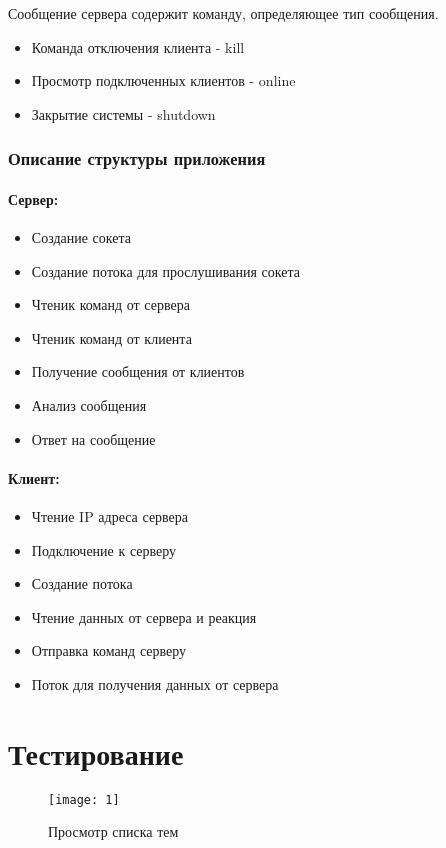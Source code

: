Сообщение сервера содержит команду, определяющее тип сообщения.
\begin{itemize}
\item Команда отключения клиента - kill
\item Просмотр подключенных клиентов  - online
\item Закрытие системы - shutdown
\end{itemize}


\subsubsection{Описание структуры приложения}
\paragraph{Сервер:}
\begin{itemize}
\item Создание сокета
\item Создание потока для прослушивания сокета
\item Чтеник команд от сервера
\item Чтеник команд от клиента
\item Получение сообщения от клиентов
\item Анализ сообщения
\item Ответ на сообщение
\end{itemize}

\paragraph{Клиент:}
\begin{itemize}
\item Чтение IP адреса сервера
\item Подключение к серверу
\item Создание потока
\item Чтение данных от сервера и реакция
\item Отправка команд серверу
\item Поток для получения данных от сервера
\end{itemize}


\section{Тестирование}

\begin{figure}[H]
	\begin{center}
		\texttt{[image: 1]}
		\caption{Просмотр списка тем} 
		\label{pic:pic_name} %
	\end{center}
\end{figure}

